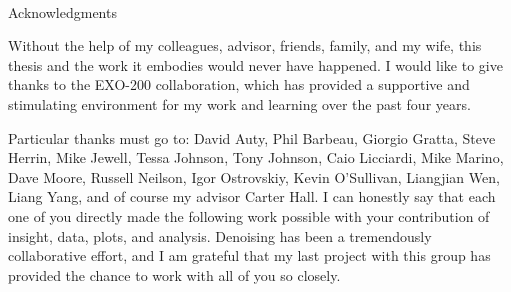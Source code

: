 
\renewcommand{\baselinestretch}{2}
\small\normalsize
\hbox{\ }
 
\vspace{-.65in}

\begin{center}
\large{Acknowledgments} 
\end{center} 

\vspace{1ex}

Without the help of my colleagues, advisor, friends, family, and my wife, this thesis and the work it embodies would never have happened.  I would like to give thanks to the EXO-200 collaboration, which has provided a supportive and stimulating environment for my work and learning over the past four years.

Particular thanks must go to: David Auty, Phil Barbeau, Giorgio Gratta, Steve Herrin, Mike Jewell, Tessa Johnson, Tony Johnson, Caio Licciardi, Mike Marino, Dave Moore, Russell Neilson, Igor Ostrovskiy, Kevin O'Sullivan, Liangjian Wen, Liang Yang, and of course my advisor Carter Hall.  I can honestly say that each one of you directly made the following work possible with your contribution of insight, data, plots, and analysis.  Denoising has been a tremendously collaborative effort, and I am grateful that my last project with this group has provided the chance to work with all of you so closely.
